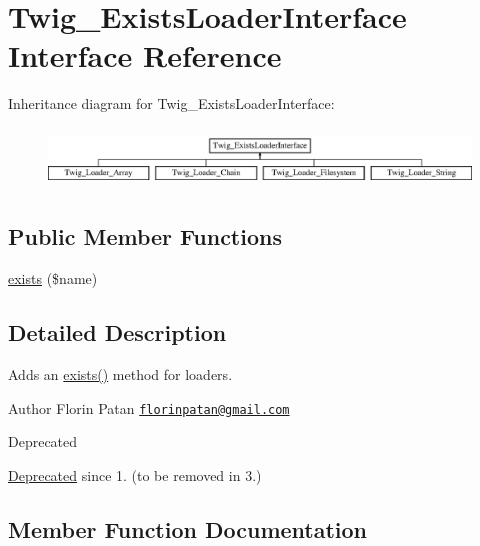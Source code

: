 \hypertarget{interface_twig___exists_loader_interface}{}\section{Twig\+\_\+\+Exists\+Loader\+Interface Interface Reference}
\label{interface_twig___exists_loader_interface}
Inheritance diagram for Twig\+\_\+\+Exists\+Loader\+Interface\+:\begin{figure}[H]
\begin{center}
\leavevmode
\includegraphics[height=1.600000cm]{interface_twig___exists_loader_interface}
\end{center}
\end{figure}
\subsection*{Public Member Functions}
\begin{DoxyCompactItemize}
\item 
\hyperlink{interface_twig___exists_loader_interface_a0909de156d39accf2e3c52f4bce3765f}{exists} (\$name)
\end{DoxyCompactItemize}


\subsection{Detailed Description}
Adds an \hyperlink{interface_twig___exists_loader_interface_a0909de156d39accf2e3c52f4bce3765f}{exists()} method for loaders.

\begin{DoxyAuthor}{Author}
Florin Patan \href{mailto:florinpatan@gmail.com}{\tt florinpatan@gmail.\+com}
\end{DoxyAuthor}
\begin{DoxyRefDesc}{Deprecated}
\item[\hyperlink{deprecated__deprecated000003}{Deprecated}]since 1. (to be removed in 3.) \end{DoxyRefDesc}


\subsection{Member Function Documentation}
\hypertarget{interface_twig___exists_loader_interface_a0909de156d39accf2e3c52f4bce3765f}{}

